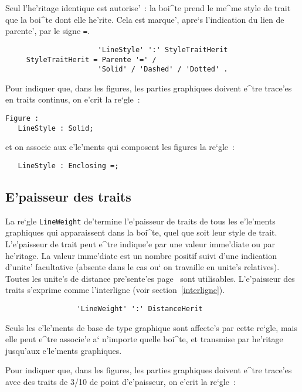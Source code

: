 {Seul l'he'ritage identique est autorise'~: la boi^te prend le me^me style
de trait que la boi^te dont elle he'rite. Cela est marque', apre`s
l'indication du lien de parente', par le signe {\tt =}.

\begin{verbatim}
                      'LineStyle' ':' StyleTraitHerit
     StyleTraitHerit = Parente '=' /
                      'Solid' / 'Dashed' / 'Dotted' .
\end{verbatim}

\begin{example}
Pour indiquer que, dans les figures, les parties graphiques doivent e^tre
trace'es en traits continus, on e'crit la re`gle~:

\begin{verbatim}
Figure :
   LineStyle : Solid;
\end{verbatim}
et on associe aux e'le'ments qui composent les figures la re`gle~:
\begin{verbatim}
   LineStyle : Enclosing =;
\end{verbatim}
\end{example}

\subsection{E'paisseur des traits}

La re`gle {\tt LineWeight} de'termine l'e'paisseur de traits de tous les
e'le'ments graphiques qui apparaissent dans la boi^te, quel que soit leur
style de trait.
L'e'paisseur de trait peut e^tre indique'e par une valeur imme'diate ou par
he'ritage. La valeur imme'diate est un nombre positif suivi d'une indication
d'unite' facultative (absente dans le cas ou` on travaille en unite's
relatives). Toutes les unite's de distance pre'sente'es page~\pageref{unites}
sont utilisables. L'e'paisseur des traits s'exprime comme l'interligne
(voir section~\ref{interligne}).

\begin{verbatim}
                 'LineWeight' ':' DistanceHerit
\end{verbatim}

Seuls les e'le'ments de base de type graphique sont affecte's par cette
re`gle, mais elle peut e^tre associe'e a` n'importe quelle boi^te, et
transmise par he'ritage jusqu'aux e'le'ments graphiques.

\begin{example}
Pour indiquer que, dans les figures, les parties graphiques doivent e^tre
trace'es avec des traits de 3/10 de point d'e'paisseur, on e'crit la re`gle~:


\end{example}}
